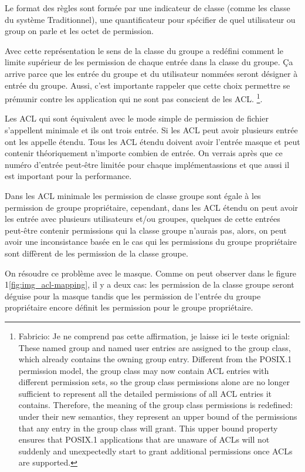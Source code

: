 Le format des règles sont formée par une indicateur de classe (comme les classe du système Traditionnel), une quantificateur pour spécifier de quel utilisateur ou group on parle et les octet de permission.

Avec cette représentation le sens de la classe du groupe a redéfini comment le limite supérieur de les permission de chaque entrée dans la classe du groupe. Ça arrive parce que les entrée du groupe et du utilisateur nommées seront désigner à entrée du groupe. Aussi, c'est importante rappeler que cette choix permettre se prémunir contre les application qui ne sont pas conscient de les ACL.
\footnote{Fabricio: Je ne comprend pas cette affirmation, je laisse ici le teste orignial: 
These named group and named user entries are assigned to the group class, which already contains the owning group entry. Different from the POSIX.1 permission model, the group class may now contain ACL entries with different permission sets, so the group class permissions alone are no longer sufficient to represent all the detailed permissions of all ACL entries it contains. Therefore, the meaning of the group class permissions is redefined: under their new semantics, they represent an upper bound of the permissions that any entry in the group class will grant. This upper bound property ensures that POSIX.1 applications that are unaware of ACLs will not suddenly and unexpectedly start to grant additional permissions once ACLs are supported.}.

Les ACL qui sont équivalent avec le mode simple de permission de fichier s'appellent minimale et ils ont trois entrée. Si les ACL peut avoir plusieurs entrée ont les appelle étendu. Tous les ACL étendu doivent avoir l'entrée masque et peut contenir théoriquement n'importe combien de entrée. On verrais après que ce numéro d'entrée peut-être limitée pour chaque implémentassions et que aussi il est important pour la performance.

Dans les ACL minimale les permission de classe groupe sont égale à les permission de groupe propriétaire, cependant, dans les ACL étendu on peut avoir les entrée avec plusieurs utilisateurs et/ou groupes, quelques de cette entrées peut-être contenir permissions qui la classe groupe n'aurais pas, alors, on peut avoir une inconsistance basée en le cas qui les permissions du groupe propriétaire sont diffèrent de les permission de la classe groupe. 

On résoudre ce problème avec le masque. Comme on peut observer dans le figure 1\ref{fig:img_acl-mapping}, il y a deux cas: les permission de la classe groupe seront déguise pour la masque tandis que les permission de l'entrée du groupe propriétaire encore définit les permission pour le groupe propriétaire.    



